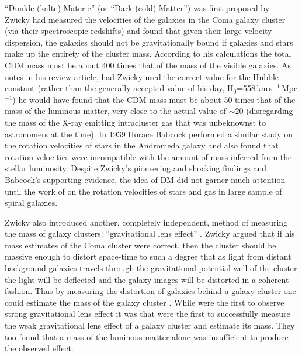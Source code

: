 ``Dunkle (kalte) Materie'' (or ``Dark (cold) Matter'') was first proposed by \citet{Zwicky:1933ub}.
Zwicky had measured the velocities of the galaxies in the Coma galaxy cluster (via their spectroscopic redshifts) and found that given their large velocity dispersion, the galaxies should not be gravitationally bound if galaxies and stars make up the entirety of the cluster mass.
According to his calculations the total CDM mass must be about 400 times that of the mass of the visible galaxies. 
As \citet{vandenBergh:1999jf} notes in his review article, had Zwicky used the correct value for the Hubble constant (rather than the generally accepted value of his day, H$_0$=558\,km\,s$^{-1}$\,Mpc$^{-1}$) he would have found that the CDM mass must be about 50 times that of the mass of the luminous matter, very close to the actual value of $\sim20$ (disregarding the mass of the X-ray emitting intracluster gas that was unbeknownst to astronomers at the time).
In 1939 Horace Babcock performed a similar study on the rotation velocities of stars in the Andromeda galaxy and also found that rotation velocities were incompatible with the amount of mass inferred from the stellar luminosity.
Despite Zwicky's pioneering and shocking findings and Babcock's supporting evidence, the idea of DM did not garner much attention until the work of \citet{Rubin:1970gu} on the rotation velocities of stars and gas in large sample of spiral galaxies.

Zwicky also introduced another, completely independent, method of measuring the mass of galaxy clusters: ``gravitational lens effect'' \citep{Zwicky:1937ec}.
Zwicky argued that if his mass estimates of the Coma cluster were correct, then the cluster should be massive enough to distort space-time to such a degree that as light from distant background galaxies travels through the gravitational potential well of the cluster the light will be deflected and the galaxy images will be distorted in a coherent fashion.
Thus by measuring the distortion of galaxies behind a galaxy cluster one could estimate the mass of the galaxy cluster \citep[see Chapter 2 of][for an introduction to weak gravitational lensing]{Courbin:2002wh}.
While \citet{Lynds:1989bc} were the first to observe strong gravitational lens effect it was\citet{Tyson:1990bc} that were the first to successfully measure the weak gravitational lens effect of a galaxy cluster and estimate its mass.
They too found that a mass of the luminous matter alone was insufficient to produce the observed effect.

